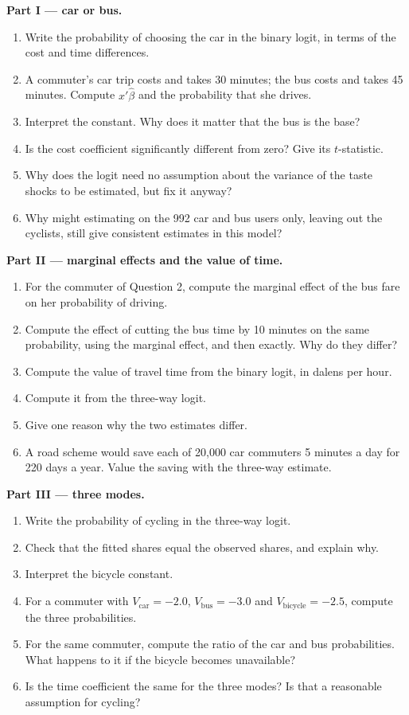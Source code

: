\begin{problem}
\medskip\noindent\textbf{Part I --- car or bus.}
\begin{enumerate}
\item Write the probability of choosing the car in the binary logit, in terms of
the cost and time differences.
\item A commuter's car trip costs  and takes 30 minutes; the bus costs
 and takes 45 minutes. Compute $x'\hat\beta$ and the probability that she
drives.
\item Interpret the constant. Why does it matter that the bus is the base?
\item Is the cost coefficient significantly different from zero? Give its
$t$-statistic.
\item Why does the logit need no assumption about the variance of the taste
shocks to be estimated, but fix it anyway?
\item Why might estimating on the 992 car and bus users only, leaving out the
cyclists, still give consistent estimates in this model?
\end{enumerate}

\medskip\noindent\textbf{Part II --- marginal effects and the value of time.}
\begin{enumerate}[resume]
\item For the commuter of Question 2, compute the marginal effect of the bus
fare on her probability of driving.
\item Compute the effect of cutting the bus time by 10 minutes on the same
probability, using the marginal effect, and then exactly. Why do they differ?
\item Compute the value of travel time from the binary logit, in dalens per hour.
\item Compute it from the three-way logit.
\item Give one reason why the two estimates differ.
\item A road scheme would save each of 20{,}000 car commuters 5 minutes a day
for 220 days a year. Value the saving with the three-way estimate.
\end{enumerate}

\medskip\noindent\textbf{Part III --- three modes.}
\begin{enumerate}[resume]
\item Write the probability of cycling in the three-way logit.
\item Check that the fitted shares equal the observed shares, and explain why.
\item Interpret the bicycle constant.
\item For a commuter with $V_{\text{car}} = -2.0$, $V_{\text{bus}} = -3.0$ and
$V_{\text{bicycle}} = -2.5$, compute the three probabilities.
\item For the same commuter, compute the ratio of the car and bus probabilities.
What happens to it if the bicycle becomes unavailable?
\item Is the time coefficient the same for the three modes? Is that a
reasonable assumption for cycling?
\end{enumerate}


\end{problem}
